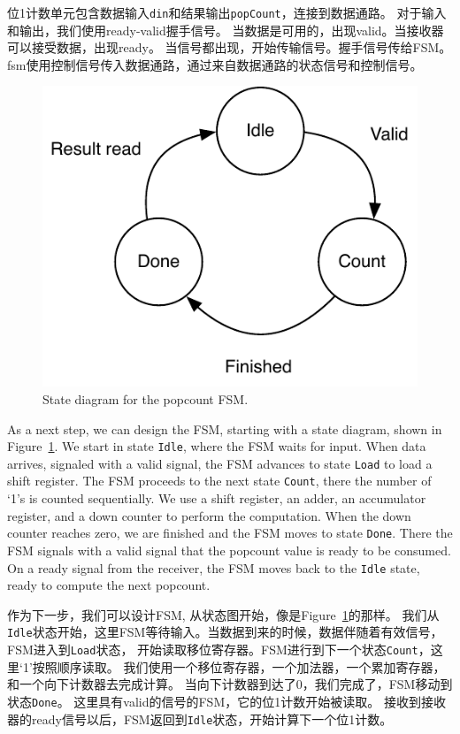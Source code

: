 \documentclass[%
    10pt,
    headinclude, footexclude,
    openright, %
    notitlepage,
    cleardoubleempty,
    headsepline,
    pointlessnumbers,
    bibtotoc, idxtotoc,
    ]{scrbook}
\newcommand{\code}[1]{{\small{\texttt{#1}}}}
\newcommand{\scale}{0.7}
\begin{document}
{位1计数单元包含数据输入\code{din}和结果输出\code{popCount}，连接到数据通路。
对于输入和输出，我们使用ready-valid握手信号。
当数据是可用的，出现valid。当接收器可以接受数据，出现ready。
当信号都出现，开始传输信号。握手信号传给FSM。
fsm使用控制信号传入数据通路，通过来自数据通路的状态信号和控制信号。

\begin{figure}
  \centering
  \includegraphics[scale=\scale]{figures/popcnt-states}
  \caption{State diagram for the popcount FSM.}
  \label{fig:popcnt-states}
\end{figure}

As a next step, we can design the FSM, starting with a state diagram, shown in
Figure~\ref{fig:popcnt-states}. We start in state \code{Idle}, where the FSM waits
for input. When data arrives, signaled with a valid signal, the FSM advances to state \code{Load}
to load a shift register. The FSM proceeds to the next state \code{Count}, there the number
of `1's is counted sequentially. We use a shift register, an adder, an accumulator
register, and a down counter to perform the computation. When the down counter reaches
zero, we are finished and the FSM moves to state \code{Done}. There the FSM signals with a valid
signal that the popcount value is ready to be consumed. On a ready signal from the
receiver, the FSM moves back to the \code{Idle} state, ready to compute the next popcount.

作为下一步，我们可以设计FSM, 从状态图开始，像是Figure~\ref{fig:popcnt-states}的那样。
我们从\code{Idle}状态开始，这里FSM等待输入。当数据到来的时候，数据伴随着有效信号，FSM进入到\code{Load}状态，
开始读取移位寄存器。FSM进行到下一个状态\code{Count}，这里‘1’按照顺序读取。
我们使用一个移位寄存器，一个加法器，一个累加寄存器，和一个向下计数器去完成计算。
当向下计数器到达了0，我们完成了，FSM移动到状态\code{Done}。
这里具有valid的信号的FSM，它的位1计数开始被读取。
接收到接收器的ready信号以后，FSM返回到\code{Idle}状态，开始计算下一个位1计数。

}
\end{document}
